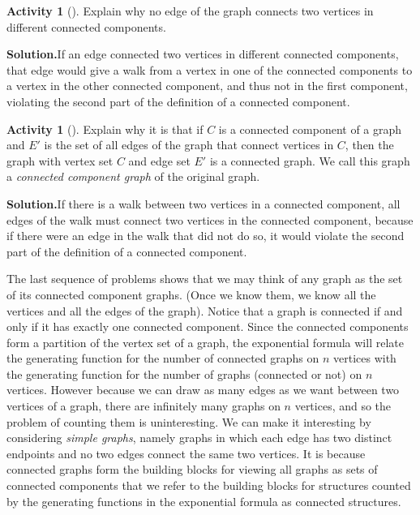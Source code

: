 \documentclass[10pt,]{book}
\theoremstyle{plain}
\theoremstyle{definition}
\newtheorem{activity}[project]{Activity}
\numberwithin{equation}{chapter}
\begin{document}
\begin{activity}[]\label{activity-119}
Explain why no edge of the graph connects two vertices in different connected components.%
\par\medskip\noindent%
\textbf{Solution.}\quad If an edge connected two vertices in different connected components, that edge would give a walk from a vertex in one of the connected components to a vertex in the other connected component, and thus not in the first component, violating the second part of the definition of a connected component.%
\end{activity}
\begin{activity}[]\label{activity-120}
Explain why it is that if \(C\) is a connected component of a graph and \(E'\) is the set of all edges of the graph that connect vertices in \(C\), then the graph with vertex set \(C\) and edge set \(E'\) is a connected graph. We call this graph a \emph{connected component graph} of the original graph.%
\par\medskip\noindent%
\textbf{Solution.}\quad If there is a walk between two vertices in a connected component, all edges of the walk must connect two vertices in the connected component, because if there were an edge in the walk that did not do so, it would violate the second part of the definition of a connected component.%
\end{activity}
The last sequence of problems shows that we may think of any graph as the set of its connected component graphs. (Once we know them, we know all the vertices and all the edges of the graph). Notice that a graph is connected if and only if it has exactly one connected component. Since the connected components form a partition of the vertex set of a graph, the exponential formula will relate the generating function for the number of connected graphs on \(n\) vertices with the generating function for the number of graphs (connected or not) on \(n\) vertices. However because we can draw as many edges as we want between two vertices of a graph, there are infinitely many graphs on \(n\) vertices, and so the problem of counting them is uninteresting. We can make it interesting by considering \emph{simple graphs}, namely graphs in which each edge has two distinct endpoints and no two edges connect the same two vertices. It is because connected graphs form the building blocks for viewing all graphs as sets of connected components that we refer to the building blocks for structures counted by the generating functions in the exponential formula as connected structures.%
\end{document}
